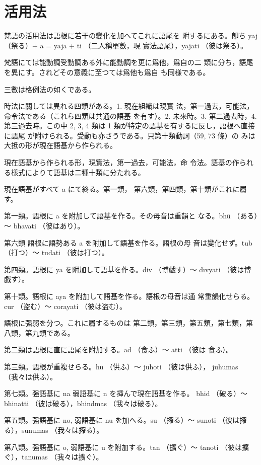 \clearpage
\section{活用法}
\numberParagraph
梵語の活用法は語根に若干の變化を加へてこれに語尾を
附するにある。卽ち yaj （祭る）+ a = yaja + ti （二人稱單數，現
實法語尾），yajati （彼は祭る）。

梵語にては能動調受動調ある外に能動調を更に爲他，爲自の二
類に分ち，語尾を異にす。されどその意義に至つては爲他も爲自
も同様である。

三數は格例法の如くである。

\numberParagraph
時法に關しては異れる四類がある。1. 現在組織は現實
法，第一過去，可能法，命令法である（これら四類は共通の語基
を有す）。2. 未來時。3. 第二過去時，4. 第三過去時。この中
2, 3, 4 類は 1 類が特定の語基を有するに反し，語根へ直接に語尾
が附けられる。受動も亦さうである。只第十類動詞（59, 73 條）の
みは大抵の形が現在語基から作られる。

\numberParagraph
現在語基から作られる形，現實法，第一過去，可能法，命
令法。語基の作られる樣式によりて語基は二種十類に分たれる。

 現在語基がすべて a にて終る。第一類，
第六類，第四類，第十類がこれに屬す。

第一類。語根に a を附加して語基を作る。その母音は重韻と
なる。bhū （ある）～ bhavati （彼はあり）。

第六類 語根に語勢ある a を附加して語基を作る。語根の母
音は變化せず。tub （打つ）～ tudati （彼は打つ）。

第四類。語根に ya を附加して語基を作る。div （博戯す）～
dīvyati （彼は博戯す）。

第十類。語根に aya を附加して語基を作る。語根の母音は通
常重韻化せらる。cur （盗む）～ corayati （彼は盗む）。

 語根に强弱を分つ。これに屬するものは
第二類，第三類，第五類，第七類，第八類，第九類である。

第二類は語根に直に語尾を附加する。ad （食ふ）～ atti （彼は
食ふ）。

第三類。語根が重複せらる。hu （供ふ）～ juhoti （彼は供ふ），
juhumas （我々は供ふ）。

第七類。强語基に na 弱語基に n を挿んで現在語基を作る。
bhid （破る）～ bhinatti （彼は破る），bhindmas （我々は破る）。

第五類。强語基に no, 弱語基に nu を加へる。su （搾る）～
sunoti （彼は搾る），sunumas （我々は搾る）。

第八類。强語基に o, 弱語基に u を附加する。tan （擴ぐ）～
tanoti （彼は擴ぐ），tanumas （我々は擴ぐ）。


